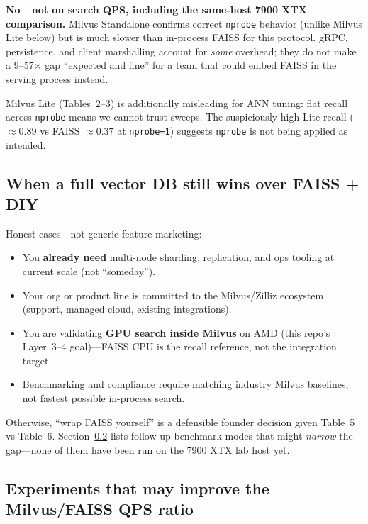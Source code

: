 \documentclass[11pt,a4paper]{article}
\begin{document}
\textbf{No---not on search QPS, including the same-host 7900 XTX comparison.} Milvus
Standalone confirms correct \texttt{nprobe} behavior (unlike Milvus Lite below) but is
much slower than in-process FAISS for this protocol. gRPC, persistence, and client
marshalling account for \emph{some} overhead; they do not make a 9--57$\times$ gap
``expected and fine'' for a team that could embed FAISS in the serving process instead.

Milvus Lite (Tables~2--3) is additionally misleading for ANN tuning: flat recall across
\texttt{nprobe} means we cannot trust sweeps. The suspiciously high Lite recall
($\approx 0.89$ vs FAISS $\approx 0.37$ at \texttt{nprobe=1}) suggests \texttt{nprobe}
is not being applied as intended.

\subsection{When a full vector DB still wins over FAISS + DIY}

Honest cases---not generic feature marketing:
\begin{itemize}[leftmargin=*]
  \item You \textbf{already need} multi-node sharding, replication, and ops tooling at
        current scale (not ``someday'').
  \item Your org or product line is committed to the Milvus/Zilliz ecosystem (support,
        managed cloud, existing integrations).
  \item You are validating \textbf{GPU search inside Milvus} on AMD (this repo's Layer~3--4
        goal)---FAISS CPU is the recall reference, not the integration target.
  \item Benchmarking and compliance require matching industry Milvus baselines, not
        fastest possible in-process search.
\end{itemize}
Otherwise, ``wrap FAISS yourself'' is a defensible founder decision given Table~5 vs
Table~6. Section~\ref{sec:milvus-faiss-qps-experiments} lists follow-up benchmark modes that
might \emph{narrow} the gap---none of them have been run on the 7900 XTX lab host yet.

\subsection{Experiments that may improve the Milvus/FAISS QPS ratio}
\label{sec:milvus-faiss-qps-experiments}
\end{document}
